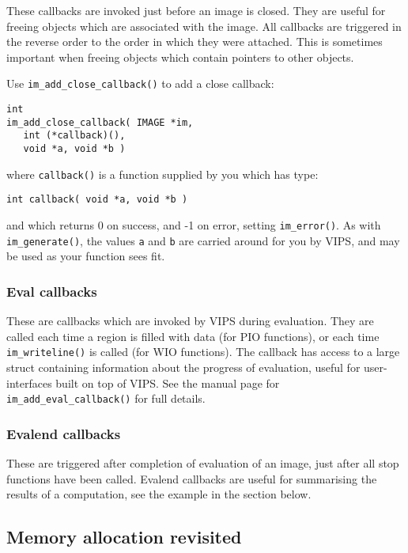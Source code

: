These callbacks are invoked just before an image is closed. They are useful
for freeing objects which are associated with the image. All callbacks are
triggered in the reverse order to the order in which they were attached. This
is sometimes important when freeing objects which contain pointers to
other objects.

Use \verb+im_add_close_callback()+ to add a close callback:

\begin{verbatim}
int 
im_add_close_callback( IMAGE *im, 
   int (*callback)(), 
   void *a, void *b ) 
\end{verbatim}
   
\noindent
where \verb+callback()+ is a function supplied by you which has type:

\begin{verbatim}
int callback( void *a, void *b ) 
\end{verbatim}

\noindent
and which returns 0 on success, and -1 on error, setting
\verb+im_error()+. As with \verb+im_generate()+, the values \verb+a+
and \verb+b+ are carried around for you by VIPS, and may be used as your
function sees fit.

\subsubsection{Eval callbacks}

These are callbacks which are invoked by VIPS during evaluation. They
are called each time a region is filled with data (for PIO functions), or
each time \verb+im_writeline()+ is called (for WIO functions). The callback
has access to a large struct containing information about the progress of
evaluation, useful for user-interfaces built on top of VIPS. See the manual
page for \verb+im_add_eval_callback()+ for full details.

\subsubsection{Evalend callbacks}

These are triggered after completion of evaluation of an image, just after all
stop functions have been called. Evalend callbacks are useful for summarising
the results of a computation, see the example in the section below.

\subsection{Memory allocation revisited}

